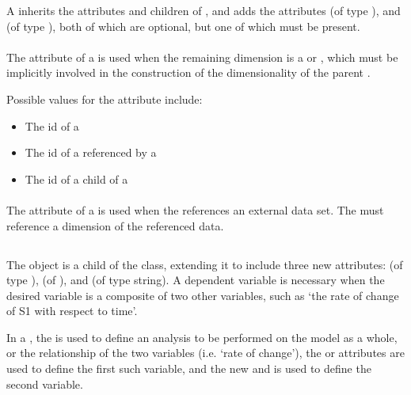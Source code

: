 \begin{blockChanged}
A \RemainingDimension inherits the attributes and children of \SedBase, and adds the attributes  (of type \SIdRef), and  (of type ), both of which are optional, but one of which must be present.

\paragraph*{}
The  attribute of a \RemainingDimension is used when the remaining dimension is a \Task or \RepeatedTask, which must be implicitly involved in the construction of the dimensionality of the parent \Variable.

Possible values for the  attribute include:
\begin{itemize}
        \item The id of a \RepeatedTask
        \item The id of a \Task referenced by a \RepeatedTask
        \item The id of a \SubTask child of a \RepeatedTask
\end{itemize}

\paragraph*{}
The  attribute of a \RemainingDimension is used when the \Variable references an external data set.  The  must reference a dimension of the referenced data.


\subsection{}
\label{class:dependentVariable}

The \DependentVariable object is a child of the \Variable class, extending it to include three new attributes:   (of type ),  (of ), and  (of type string).  A dependent variable is necessary when the desired variable is a composite of two other variables, such as `the rate of change of S1 with respect to time'.

In a \DependentVariable, the  is used to define an analysis to be performed on the model as a whole, or the relationship of the two variables (i.e. `rate of change'), the  or  attributes are used to define the first such variable, and the new  and  is used to define the second variable.  


\end{blockChanged}
